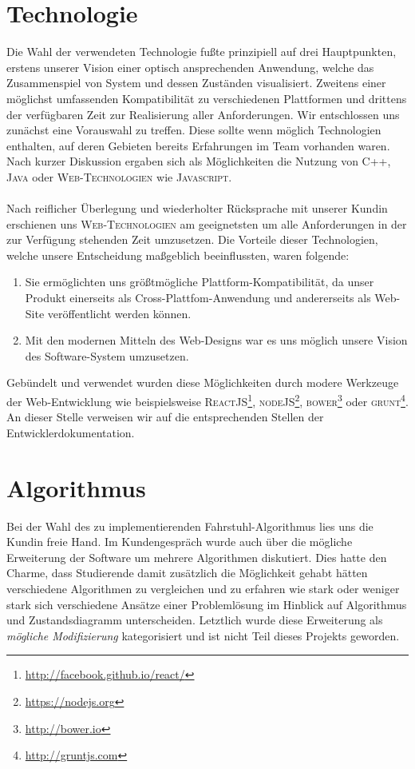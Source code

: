 \section{Technologie}
Die Wahl der verwendeten Technologie fußte prinzipiell auf drei Hauptpunkten, erstens unserer Vision einer optisch ansprechenden Anwendung, welche das Zusammenspiel von System und dessen Zuständen visualisiert. Zweitens einer möglichst umfassenden Kompatibilität zu verschiedenen Plattformen und drittens der verfügbaren Zeit zur Realisierung aller Anforderungen. Wir entschlossen uns zunächst eine Vorauswahl zu treffen. Diese sollte wenn möglich Technologien enthalten, auf deren Gebieten bereits Erfahrungen im Team vorhanden waren. Nach kurzer Diskussion ergaben sich als Möglichkeiten die Nutzung von \textsc{C++}, \textsc{Java} oder \textsc{Web-Technologien} wie \textsc{Javascript}.

\paragraph*{}Nach reiflicher Überlegung und wiederholter Rücksprache mit unserer Kundin erschienen uns \textsc{Web-Technologien} am geeignetsten um alle Anforderungen in der zur Verfügung stehenden Zeit umzusetzen. Die Vorteile dieser Technologien, welche unsere Entscheidung maßgeblich beeinflussten, waren folgende:

\begin{enumerate}
	\item Sie ermöglichten uns größtmögliche Plattform-Kompa\-tibilität, da unser Produkt einerseits als Cross-Plattfom-Anwendung und andererseits als Web-Site veröffentlicht werden können.
	\item Mit den modernen Mitteln des Web-Designs war es uns möglich unsere Vision des Software-System umzusetzen.
\end{enumerate}

Gebündelt und verwendet wurden diese Möglichkeiten durch modere Werkzeuge der Web-Entwicklung wie beispielsweise \textsc{ReactJS}\footnote{\url{http://facebook.github.io/react/}}, \textsc{nodeJS}\footnote{\url{https://nodejs.org}}, \textsc{bower}\footnote{\url{http://bower.io}} oder \textsc{grunt}\footnote{\url{http://gruntjs.com}}. An dieser Stelle verweisen wir auf die entsprechenden Stellen der Entwicklerdokumentation.

\section{Algorithmus}
Bei der Wahl des zu implementierenden Fahrstuhl-Algorithmus lies uns die Kundin freie Hand. Im Kundengespräch wurde auch über die mögliche Erweiterung der Software um mehrere Algorithmen diskutiert. Dies hatte den Charme, dass Studierende damit zusätzlich die Möglichkeit gehabt hätten verschiedene Algorithmen zu vergleichen und zu erfahren wie stark oder weniger stark sich verschiedene Ansätze einer Problemlösung im Hinblick auf Algorithmus und Zustandsdiagramm unterscheiden. Letztlich wurde diese Erweiterung als \textit{mögliche Modifizierung} kategorisiert und ist nicht Teil dieses Projekts geworden.


